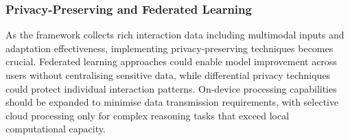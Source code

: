 \subsubsection{Privacy-Preserving and Federated Learning}
As the framework collects rich interaction data including multimodal inputs and adaptation effectiveness, implementing privacy-preserving techniques becomes crucial. Federated learning approaches could enable model improvement across users without centralising sensitive data, while differential privacy techniques could protect individual interaction patterns.
On-device processing capabilities should be expanded to minimise data transmission requirements, with selective cloud processing only for complex reasoning tasks that exceed local computational capacity.